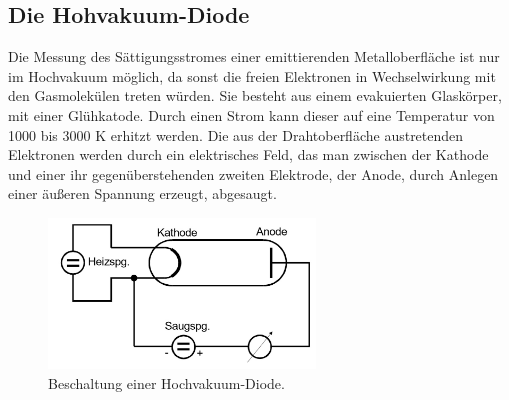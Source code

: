 \subsection{Die Hohvakuum-Diode}
Die Messung des Sättigungsstromes einer emittierenden Metalloberfläche ist nur im Hochvakuum möglich, da sonst die freien Elektronen in Wechselwirkung mit den Gasmolekülen treten würden.
Sie besteht aus einem evakuierten Glaskörper, mit einer Glühkatode.
Durch einen Strom kann dieser auf eine Temperatur von 1000 bis 3000 K erhitzt werden.
Die aus der Drahtoberfläche austretenden Elektronen werden durch ein elektrisches Feld, das man zwischen der Kathode und einer ihr gegenüberstehenden zweiten Elektrode, der Anode, durch Anlegen einer äußeren Spannung erzeugt, abgesaugt.
\begin{figure}
    \centering
    \includegraphics[height=4.0cm]{data/abb3.jpg}
    \caption{Beschaltung einer Hochvakuum-Diode. \cite{V504}}
    \label{fig:abb3}
\end{figure} \\
\noindent

